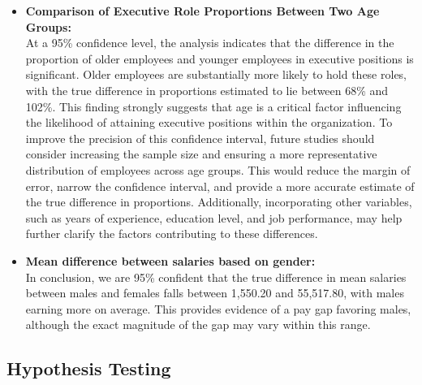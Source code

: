 \documentclass[12pt,a4paper]{article}
\begin{document}
\begin{itemize}
    \item \textbf{Comparison of Executive Role Proportions Between Two Age Groups:} \\
At a 95\% confidence level, the analysis indicates that the difference in the proportion of older employees and younger employees in executive positions is significant. Older employees are substantially more likely to hold these roles, with the true difference in proportions estimated to lie between 68\% and 102\%. This finding strongly suggests that age is a critical factor influencing the likelihood of attaining executive positions within the organization. To improve the precision of this confidence interval, future studies should consider increasing the sample size and ensuring a more representative distribution of employees across age groups. This would reduce the margin of error, narrow the confidence interval, and provide a more accurate estimate of the true difference in proportions. Additionally, incorporating other variables, such as years of experience, education level, and job performance, may help further clarify the factors contributing to these differences.

    \item \textbf{Mean difference between salaries based on gender:} \\
    In conclusion, we are 95\% confident that the true difference in mean salaries between males and females falls between 1,550.20 and 55,517.80, with males earning more on average. This provides evidence of a pay gap favoring males, although the exact magnitude of the gap may vary within this range.
 
\end{itemize}







\vspace{1em}
\subsection{Hypothesis Testing}
\end{document}
